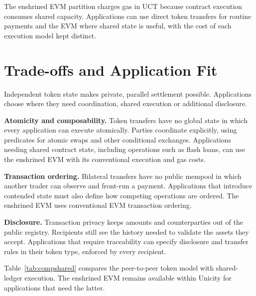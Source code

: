 The enshrined EVM partition charges gas in UCT because contract execution consumes shared capacity. Applications can use direct token transfers for routine payments and the EVM where shared state is useful, with the cost of each execution model kept distinct.

\section{Trade-offs and Application Fit}\label{sec:tradeoffs}

Independent token state makes private, parallel settlement possible. Applications choose where they need coordination, shared execution or additional disclosure.

\textbf{Atomicity and composability.} Token transfers have no global state in which every application can execute atomically. Parties coordinate explicitly, using predicates for atomic swaps and other conditional exchanges. Applications needing shared contract state, including operations such as flash loans, can use the enshrined EVM with its conventional execution and gas costs.

\textbf{Transaction ordering.} Bilateral transfers have no public mempool in which another trader can observe and front-run a payment. Applications that introduce contended state must also define how competing operations are ordered. The enshrined EVM uses conventional EVM transaction ordering.

\textbf{Disclosure.} Transaction privacy keeps amounts and counterparties out of the public registry. Recipients still see the history needed to validate the assets they accept. Applications that require traceability can specify disclosure and transfer rules in their token type, enforced by every recipient.

Table~\ref{tab:compshared} compares the peer-to-peer token model with shared-ledger execution. The enshrined EVM remains available within Unicity for applications that need the latter.

